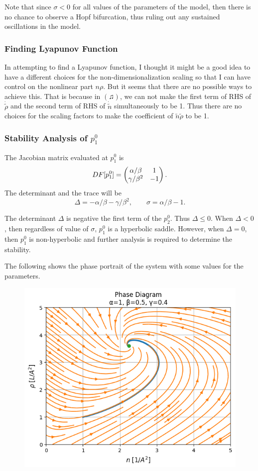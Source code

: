 \begin{observation}
	Note that since $\sigma<0$ for all values of the parameters of the model, then there is no chance to observe a Hopf bifurcation, thus ruling out any sustained oscillations in the model.
\end{observation}

\subsubsection{Finding Lyapunov Function}
In attempting to find a Lyapunov function, I thought it might be a good idea to have a different choices for the non-dimensionalization scaling so that I can have control on the nonlinear part $n\rho$. But it seems that there are no possible ways to achieve this. That is because in $(\twonotes)$, we can not make the first term of RHS of $\dot{\tilde{\rho}}$ and the second term of RHS of $\dot{\tilde{n}}$ simultaneously to be 1. Thus there are no choices for the scaling factors to make the coefficient of $\tilde{n}\tilde{\rho}$ to be 1.


\subsubsection{Stability Analysis of $p^0_1$}
The Jacobian matrix evaluated at $p^0_1$ is
\[ DF[p^0_1] = \begin{pmatrix} \alpha/\beta & 1 \\ \gamma/\beta^2 & -1 \end{pmatrix}. \]
The determinant and the trace will be
\[  \Delta = -\alpha/\beta - \gamma/\beta^2, \qquad \sigma = \alpha/\beta-1. \]
\begin{observation}
	The determinant $\Delta$ is negative the first term of the $p^0_2$. Thus $\Delta\leq0$. When $\Delta<0$, then regardless of value of $\sigma$, $p^0_1$ is a hyperbolic saddle. However, when $\Delta=0$, then $p^0_1$ is non-hyperbolic and further analysis is required to determine the stability.
\end{observation}
The following shows the phase portrait of the system with some values for the parameters.
\begin{figure}[h!]
	\centering
	\includegraphics[width=0.5\linewidth]{images/simpleODEModel1PhasePortrait}

	\label{fig:simpleodemodel1phaseportrait}
\end{figure}


